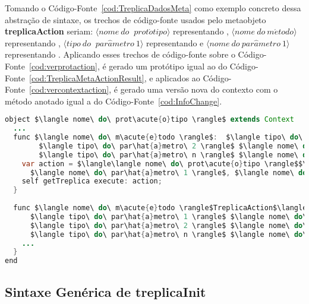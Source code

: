 Tomando o Código-Fonte~\ref{cod:TreplicaDadosMeta} como exemplo concreto dessa abstração de sintaxe, os trechos de código-fonte usados pelo metaobjeto \textbf{treplicaAction} seriam: $\langle nome\ do\ $ $prot\acute{o}tipo \rangle$ representando , $\langle nome\ do\ m\acute{e}todo \rangle$ representando , $\langle tipo\ do\ $ $par\hat{a}metro\ 1 \rangle$ representando  e $\langle nome\ do\ par\hat{a}metro\ 1 \rangle$ representando . Aplicando esses trechos de código-fonte sobre o Código-Fonte~\ref{cod:verprotaction}, é gerado um protótipo igual ao do Código-Fonte~\ref{cod:TreplicaMetaActionResult}, e aplicados ao Código-Fonte~\ref{cod:vercontextaction}, é gerado uma versão nova do contexto com o método anotado igual a do Código-Fonte~\ref{cod:InfoChange}.

\begin{lstlisting}[language=Java, caption={Nova versão do protótipo que contém o método anotado}, label={cod:vercontextaction}, mathescape=true]
object $\langle nome\ do\ prot\acute{o}tipo \rangle$ extends Context
  ...
  func $\langle nome\ do\ m\acute{e}todo \rangle$:  $\langle tipo\ do\ par\hat{a}metro\ 1 \rangle$ $\langle nome\ do\ par\hat{a}metro\ 1 \rangle$, 
        $\langle tipo\ do\ par\hat{a}metro\ 2 \rangle$ $\langle nome\ do\ par\hat{a}metro\ 2 \rangle$, 
        $\langle tipo\ do\ par\hat{a}metro\ n \rangle$ $\langle nome\ do\ par\hat{a}metro\ n \rangle$ {
    var action = $\langle\langle nome\ do\ prot\acute{o}tipo \rangle$$\langle nome\ do\ m\acute{e}todo \rangle\rangle$ new: 
      $\langle nome\ do\ par\hat{a}metro\ 1 \rangle$, $\langle nome\ do\ par\hat{a}metro\ 2 \rangle$, $\langle nome\ do\ par\hat{a}metro\ n \rangle$;
    self getTreplica execute: action;
  }
  
  func $\langle nome\ do\ m\acute{e}todo \rangle$TreplicaAction$\langle id\ \acute{u}nico \rangle$: 
      $\langle tipo\ do\ par\hat{a}metro\ 1 \rangle$ $\langle nome\ do\ par\hat{a}metro\ 1 \rangle$, 
      $\langle tipo\ do\ par\hat{a}metro\ 2 \rangle$ $\langle nome\ do\ par\hat{a}metro\ 2 \rangle$, 
      $\langle tipo\ do\ par\hat{a}metro\ n \rangle$ $\langle nome\ do\ par\hat{a}metro\ n \rangle$ {
    ...
  }
end
\end{lstlisting}

\subsection{Sintaxe Genérica de \textbf{treplicaInit}}


